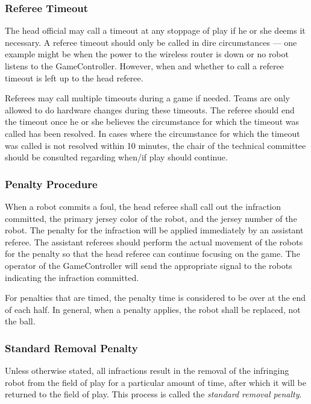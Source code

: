 \subsubsection{Referee Timeout}
\label{sec:referee_timeout}
The head official may call a timeout at any stoppage of play if he or she deems it necessary.  A referee timeout should only be called in dire circumstances --- one example might be when the power to the wireless router is down or no robot listens to the GameController.  However, when and whether to call a referee timeout is left up to the head referee.

Referees may call multiple timeouts during a game if needed.  Teams are only allowed to do hardware changes during these timeouts.  The referee should end the timeout once he or she believes the circumstance for which the timeout was called has been resolved.  In cases where the circumstance for which the timeout was called is not resolved within 10 minutes, the chair of the technical committee should be consulted regarding when/if play should continue.

\subsubsection{Penalty Procedure}
\label{sec:penalty_procedure}

When a robot commits a foul, the head referee shall call out the infraction committed, the primary jersey color of the robot, and the jersey number of the robot. The penalty for the infraction will be applied immediately by an assistant referee. The assistant referees should perform the actual movement of the robots for the penalty so that the head referee can continue focusing on the game. The operator of the GameController will send the appropriate signal to the robots indicating the infraction committed.

For penalties that are timed, the penalty time is considered to be over at the end of each half.
In general, when a penalty applies, the robot shall be replaced, not the ball.

\subsubsection{Standard Removal Penalty}
\label{sec:removal_penalty}

Unless otherwise stated, all infractions result in the removal of the infringing robot from the field of play for a particular amount of time, after which it will be returned to the field of play. This process is called the \textit{standard removal penalty}.

